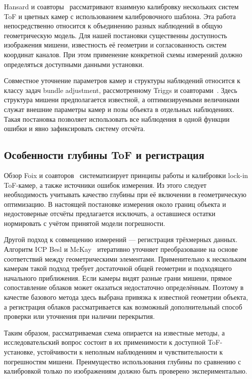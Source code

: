 Hansard и соавторы~\cite{hansard2015} рассматривают взаимную калибровку нескольких систем ToF и цветных камер с использованием калибровочного шаблона. Эта работа непосредственно относится к объединению разных наблюдений в общую геометрическую модель. Для нашей постановки существенны доступность изображения мишени, известность её геометрии и согласованность систем координат каналов. При этом применение конкретной схемы измерений должно определяться доступными данными установки.

Совместное уточнение параметров камер и структуры наблюдений относится к классу задач bundle adjustment, рассмотренному Triggs и соавторами~\cite{triggs2000}. Здесь структура мишени предполагается известной, а оптимизируемыми величинами служат внешние параметры камер и позы объекта в отдельных наблюдениях. Такая постановка позволяет использовать все наблюдения в одной функции ошибки и явно зафиксировать систему отсчёта.

\subsection{Особенности глубины ToF и регистрация}

Обзор Foix и соавторов~\cite{foix2011} систематизирует принципы работы и калибровки lock-in ToF-камер, а также источники ошибок измерения. Из этого следует необходимость учитывать качество глубины при её включении в геометрическую оптимизацию. В настоящей постановке измерения около границ объекта и недостоверные отсчёты предлагается исключать, а оставшиеся остатки нормировать с учётом принятой модели погрешности.

Другой подход к совмещению измерений --- регистрация трёхмерных данных. Алгоритм ICP Besl и McKay~\cite{besl1992} итеративно уточняет преобразование на основе соответствий между геометрическими элементами. Применительно к нескольким камерам такой подход требует достаточной общей геометрии и подходящего начального приближения. Если камеры видят разные грани мишени, прямое сопоставление облаков может оказаться недостаточно определённым. Поэтому в качестве базового метода здесь выбрана привязка к известной геометрии объекта, а регистрация облаков рассматривается как возможный дополнительный способ проверки или уточнения при наличии перекрытия.

Таким образом, рассматриваемая схема опирается на известные методы, а исследовательский вопрос состоит в их применимости к доступной ToF-установке, устойчивости к неполным наблюдениям и чувствительности к погрешностям мишени. Преимущество использования глубины по сравнению с калибровкой только по изображениям должно быть проверено экспериментально.
